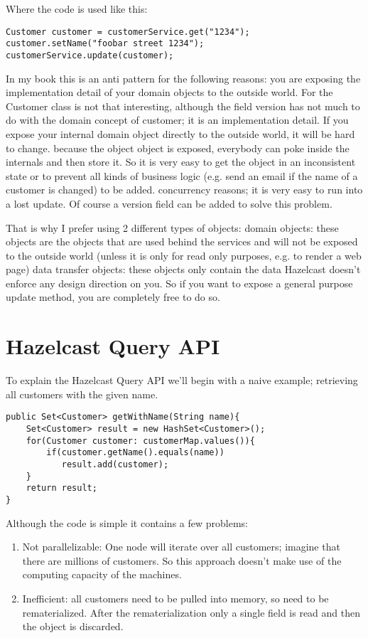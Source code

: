 Where the code is used like this:

\begin{verbatim}
Customer customer = customerService.get("1234");
customer.setName("foobar street 1234");
customerService.update(customer);
\end{verbatim}

In my book this is an anti pattern for the following reasons:
you are exposing the implementation detail of your domain objects to the outside world. For the Customer class is not that interesting, although the field version has not much to do with the domain concept of customer; it is an implementation detail.  If you expose your internal domain object directly to the outside world, it will be hard to change.
because the object object is exposed, everybody can poke inside the internals and then store it. So it is very easy to get the object in an inconsistent state or to prevent all kinds of business logic (e.g. send an email if the name of a customer is changed) to be added.
concurrency reasons; it is very easy to run into a lost update. Of course a version field can be added to solve this problem.

That is why I prefer using 2 different types of objects:
domain objects: these objects are the objects that are used behind the services and will not be exposed to the outside world (unless it is only for read only purposes, e.g. to render a web page)
data transfer objects: these objects only contain the data
Hazelcast doesn't enforce any design direction on you. So if you want to expose a general purpose update method, you are completely free to do so.

\section{Hazelcast Query API}

To explain the Hazelcast Query API we'll begin with a naive example; retrieving all customers with the given name.

\begin{verbatim}
public Set<Customer> getWithName(String name){
    Set<Customer> result = new HashSet<Customer>();
    for(Customer customer: customerMap.values()){
        if(customer.getName().equals(name))
           result.add(customer);
    }
    return result;
}
\end{verbatim}

Although the code is simple it contains a few problems:
\begin{enumerate}
\item Not parallelizable: One node will iterate over all customers; imagine that there are millions of customers. So this approach doesn't make use of the computing capacity of the machines.
\item Inefficient: all customers need to be pulled into memory, so need to be rematerialized. After the rematerialization only a single field is read and then the object is discarded. 
\end{enumerate}

